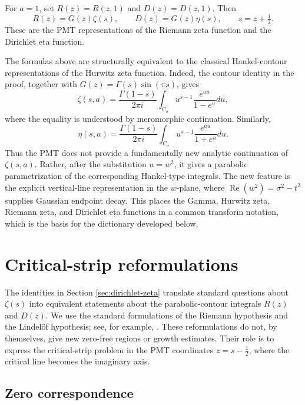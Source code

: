 \documentclass[12pt,english]{article}
\theoremstyle{plain} %
\theoremstyle{remark} %
\begin{document}
For $a=1$, set $R(z)=R(z,1)$ and $D(z)=D(z,1)$. Then
$$
R(z)=G(z)\zeta(s),
\qquad
D(z)=G(z)\eta(s),
\qquad s=z+\tfrac{1}{2}.
$$
These are the PMT representations of the Riemann zeta function and the
Dirichlet eta function.

The formulas above are structurally equivalent to the classical Hankel-contour
representations of the Hurwitz zeta function. Indeed, the contour identity in
the proof, together with $G(z)=\Gamma(s)\sin(\pi s)$, gives
$$
\zeta(s,a)
=
\frac{\Gamma(1-s)}{2\pi i}
\int_{C_\sigma}
u^{s-1}\frac{e^{au}}{1-e^u}du,
$$
where the equality is understood by meromorphic continuation. Similarly,
\begin{equation}
\eta(s,a)
=
\frac{\Gamma(1-s)}{2\pi i}
\int_{C_\sigma}
u^{s-1}\frac{e^{au}}{1+e^u}du.
\label{eq:eta-parabolic-hankel-form}
\end{equation}
Thus the PMT does not provide a fundamentally new analytic continuation of
$\zeta(s,a)$. Rather, after the substitution $u=w^2$, it gives a parabolic
parametrization of the corresponding Hankel-type integrals. The new feature is
the explicit vertical-line representation in the $w$-plane, where
$\operatorname{Re}(w^2)=\sigma^2-t^2$ supplies Gaussian endpoint decay. This
places the Gamma, Hurwitz zeta, Riemann zeta, and Dirichlet eta functions in a
common transform notation, which is the basis for the dictionary developed
below.

\section{Critical-strip reformulations}
\label{sec:critical-strip}

The identities in Section \ref{sec:dirichlet-zeta} translate standard questions
about $\zeta(s)$ into equivalent statements about the parabolic-contour
integrals $R(z)$ and $D(z)$. We use the standard formulations of the Riemann
hypothesis and the Lindel\"of hypothesis; see, for example,
\citet{Titchmarsh:1986}. These reformulations do not, by themselves, give
new zero-free regions or growth estimates. Their role is to express the
critical-strip problem in the PMT coordinates $z=s-\tfrac{1}{2}$, where the
critical line becomes the imaginary axis.

\subsection{Zero correspondence}
\label{subsec:zero-correspondence}
\end{document}
